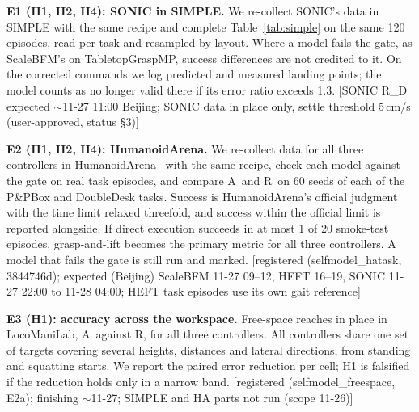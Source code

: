 \documentclass[conference]{IEEEtran}
\newif\ifdraft \drafttrue
\newcommand{\dnote}[1]{\ifdraft{\color{red}\footnotesize[#1]}\fi}
\newcommand{\Ad}{\textsc{A}}       %
\newcommand{\Rr}{\textsc{R}}       %
\begin{document}
\textbf{E1 (H1, H2, H4): SONIC in SIMPLE.} We re-collect SONIC's data in SIMPLE with the same recipe and complete Table~\ref{tab:simple} on the same 120 episodes, read per task and resampled by layout. Where a model fails the gate, as ScaleBFM's on TabletopGraspMP, success differences are not credited to it. On the corrected commands we log predicted and measured landing points; the model counts as no longer valid there if its error ratio exceeds 1.3.
\dnote{SONIC R\_D expected $\sim$11-27 11:00 Beijing; SONIC data in place only, settle threshold 5\,cm/s (user-approved, status §3)}

\textbf{E2 (H1, H2, H4): HumanoidArena.} We re-collect data for all three controllers in HumanoidArena~\cite{humanoidarena} with the same recipe, check each model against the gate on real task episodes, and compare \Ad\ and \Rr\ on 60 seeds of each of the P\&PBox and DoubleDesk tasks. Success is HumanoidArena's official judgment with the time limit relaxed threefold, and success within the official limit is reported alongside. If direct execution succeeds in at most 1 of 20 smoke-test episodes, grasp-and-lift becomes the primary metric for all three controllers. A model that fails the gate is still run and marked.
\dnote{registered (selfmodel\_hatask, 3844746d); expected (Beijing) ScaleBFM 11-27 09--12, HEFT 16--19, SONIC 11-27 22:00 to 11-28 04:00; HEFT task episodes use its own gait reference}

\textbf{E3 (H1): accuracy across the workspace.} Free-space reaches in place in LocoManiLab, \Ad\ against \Rr, for all three controllers. All controllers share one set of targets covering several heights, distances and lateral directions, from standing and squatting starts. We report the paired error reduction per cell; H1 is falsified if the reduction holds only in a narrow band.
\dnote{registered (selfmodel\_freespace, E2a); finishing $\sim$11-27; SIMPLE and HA parts not run (scope 11-26)}
\end{document}
